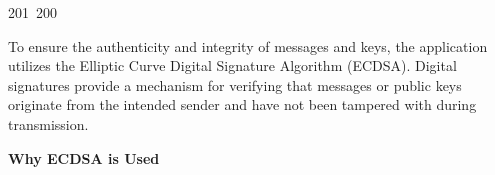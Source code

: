 201~200~\documentclass{article}
\begin{document}
	                                                                                                                                                                                                                                                                                                	                                                                                                                                        	    	                                                                                                	                                                                                                                                                                                                                                                                                                                                	                                                                        	                                                                        	                                                                                                                                        	                                                                                                                                                                                                                        	                                                                    To ensure the authenticity and integrity of messages and keys, the application utilizes the Elliptic Curve Digital Signature Algorithm (ECDSA). Digital signatures provide a mechanism for verifying that messages or public keys originate from the intended sender and have not been tampered with during transmission.

	                                                                                                                                                                                                                                                                                                	                                                                                                                                        	    	                                                                                                	                                                                                                                                                                                                                                                                                                                                	                                                                        	                                                                        	                                                                                                                                        	                                                                                                                                                                                                                        	                                                                    \textbf{Why ECDSA is Used}
\end{document}
